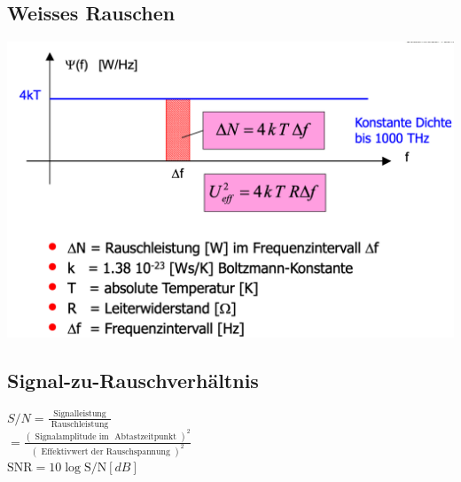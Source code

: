 \subsection{Weisses Rauschen}
\begin{center}
    \includegraphics[width=\linewidth]{graphic/rauschen/Weisses Rauschen.png}
\end{center}
\vspace{-8pt}

\subsection{Signal-zu-Rauschverhältnis}
$S / N=\frac{\text { Signalleistung }}{\text { Rauschleistung }}$\\
$=\frac{(\text { Signalamplitude im } \text { Abtastzeitpunkt })^{2}}{(\text { Effektivwert der Rauschspannung })^{2}}$\\
$\mathrm{SNR}=10 \log \mathrm{S} / \mathrm{N} [dB]$


\newpage